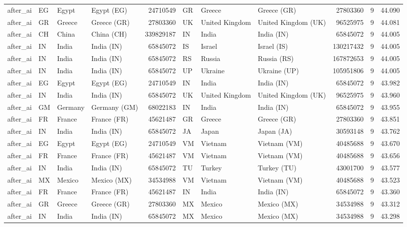 \begin{tabular}{llllrlllrrr}
after\_ai & EG & Egypt & Egypt (EG) & 24710549 & GR & Greece & Greece (GR) & 27803360 & 9 & 44.090 \\
after\_ai & GR & Greece & Greece (GR) & 27803360 & UK & United Kingdom & United Kingdom (UK) & 96525975 & 9 & 44.081 \\
after\_ai & CH & China & China (CH) & 339829187 & IN & India & India (IN) & 65845072 & 9 & 44.005 \\
after\_ai & IN & India & India (IN) & 65845072 & IS & Israel & Israel (IS) & 130217432 & 9 & 44.005 \\
after\_ai & IN & India & India (IN) & 65845072 & RS & Russia & Russia (RS) & 167872653 & 9 & 44.005 \\
after\_ai & IN & India & India (IN) & 65845072 & UP & Ukraine & Ukraine (UP) & 105951806 & 9 & 44.005 \\
after\_ai & EG & Egypt & Egypt (EG) & 24710549 & IN & India & India (IN) & 65845072 & 9 & 43.982 \\
after\_ai & IN & India & India (IN) & 65845072 & UK & United Kingdom & United Kingdom (UK) & 96525975 & 9 & 43.960 \\
after\_ai & GM & Germany & Germany (GM) & 68022183 & IN & India & India (IN) & 65845072 & 9 & 43.955 \\
after\_ai & FR & France & France (FR) & 45621487 & GR & Greece & Greece (GR) & 27803360 & 9 & 43.851 \\
after\_ai & IN & India & India (IN) & 65845072 & JA & Japan & Japan (JA) & 30593148 & 9 & 43.762 \\
after\_ai & EG & Egypt & Egypt (EG) & 24710549 & VM & Vietnam & Vietnam (VM) & 40485688 & 9 & 43.670 \\
after\_ai & FR & France & France (FR) & 45621487 & VM & Vietnam & Vietnam (VM) & 40485688 & 9 & 43.656 \\
after\_ai & IN & India & India (IN) & 65845072 & TU & Turkey & Turkey (TU) & 43001700 & 9 & 43.577 \\
after\_ai & MX & Mexico & Mexico (MX) & 34534988 & VM & Vietnam & Vietnam (VM) & 40485688 & 9 & 43.523 \\
after\_ai & FR & France & France (FR) & 45621487 & IN & India & India (IN) & 65845072 & 9 & 43.360 \\
after\_ai & GR & Greece & Greece (GR) & 27803360 & MX & Mexico & Mexico (MX) & 34534988 & 9 & 43.312 \\
after\_ai & IN & India & India (IN) & 65845072 & MX & Mexico & Mexico (MX) & 34534988 & 9 & 43.298 \\

\end{tabular}
